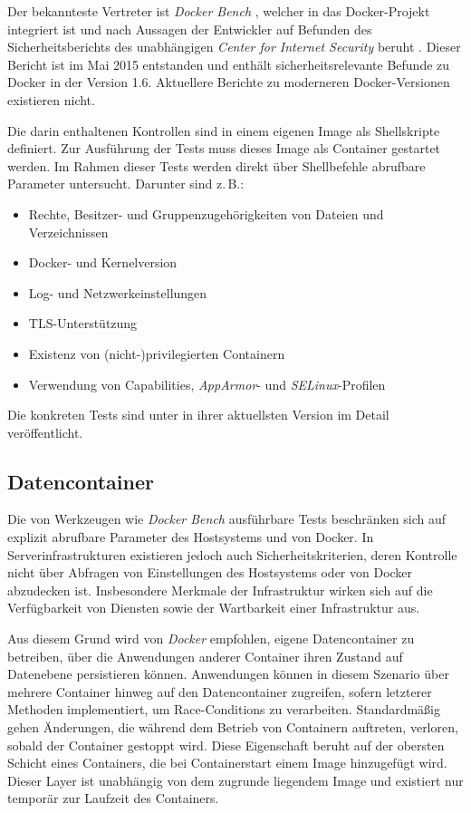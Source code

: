 \documentclass[../main.tex]{subfiles}
\begin{document}
      Der bekannteste Vertreter ist \emph{Docker Bench} \cite{githubDockerBench}, welcher in das Docker-Projekt integriert ist und nach Aussagen der Entwickler auf Befunden des Sicherheitsberichts des unabhängigen \emph{Center for Internet Security} beruht \cite{dockerBenchmarkCIS}. Dieser Bericht ist im Mai 2015 entstanden und enthält sicherheitsrelevante Befunde zu Docker in der Version 1.6. Aktuellere Berichte zu moderneren Docker-Versionen existieren nicht.

      Die darin enthaltenen Kontrollen sind in einem eigenen Image als Shellskripte definiert. Zur Ausführung der Tests muss dieses Image als Container gestartet werden. Im Rahmen dieser Tests werden direkt über Shellbefehle abrufbare Parameter untersucht. Darunter sind z.\,B.:

      \begin{itemize}
        \item Rechte, Besitzer- und Gruppenzugehörigkeiten von Dateien und Verzeichnissen
        \item Docker- und Kernelversion
        \item Log- und Netzwerkeinstellungen
        \item TLS-Unterstützung
        \item Existenz von (nicht-)privilegierten Containern
        \item Verwendung von Capabilities, \emph{AppArmor}- und \emph{SELinux}-Profilen
      \end{itemize}

      Die konkreten Tests sind unter \cite{githubDockerBenchTests} in ihrer aktuellsten Version im Detail veröffentlicht.

    \subsection{Datencontainer}
      Die von Werkzeugen wie \emph{Docker Bench} ausführbare Tests beschränken sich auf explizit abrufbare Parameter des Hostsystems und von Docker. In Serverinfrastrukturen existieren jedoch auch Sicherheitskriterien, deren Kontrolle nicht über Abfragen von Einstellungen des Hostsystems oder von Docker abzudecken ist. Insbesondere Merkmale der Infrastruktur wirken sich auf die Verfügbarkeit von Diensten sowie der Wartbarkeit einer Infrastruktur aus.

      Aus diesem Grund wird von \emph{Docker} empfohlen, eigene Datencontainer zu betreiben, über die Anwendungen anderer Container ihren Zustand auf Datenebene persistieren können. Anwendungen können in diesem Szenario über mehrere Container hinweg auf den Datencontainer zugreifen, sofern letzterer Methoden implementiert, um Race-Conditions zu verarbeiten. Standardmäßig gehen Änderungen, die während dem Betrieb von Containern auftreten, verloren, sobald der Container gestoppt wird. Diese Eigenschaft beruht auf der obersten Schicht eines Containers, die bei Containerstart einem Image hinzugefügt wird. Dieser Layer ist unabhängig von dem zugrunde liegendem Image und existiert nur temporär zur Laufzeit des Containers.
\end{document}

